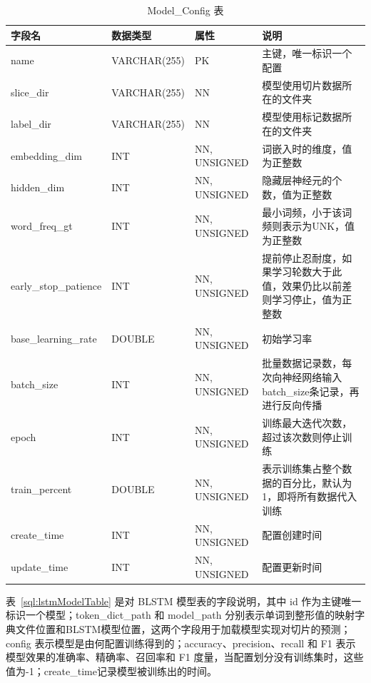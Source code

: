 \begin{table}[H]\footnotesize %
	\centering
	\caption{Model\_Config 表}
	\begin{tabular}{L{2.2cm}L{2cm}L{2.6cm}L{6cm}}
		\toprule
		\textbf{字段名}&\textbf{数据类型}&\textbf{属性}&\textbf{说明}\\
		\midrule
		name 						&VARCHAR(255)&PK&主键，唯一标识一个配置\\
		slice\_dir		 			&VARCHAR(255)&NN&模型使用切片数据所在的文件夹\\
		label\_dir		 			&VARCHAR(255)&NN&模型使用标记数据所在的文件夹\\
		embedding\_dim		  &INT&NN, UNSIGNED&词嵌入时的维度，值为正整数\\
		hidden\_dim				&INT&NN, UNSIGNED&隐藏层神经元的个数，值为正整数\\
		word\_freq\_gt			&INT&NN, UNSIGNED&最小词频，小于该词频则表示为UNK，值为正整数\\
		early\_stop\_patience		&INT&NN, UNSIGNED&提前停止忍耐度，如果学习轮数大于此值，效果仍比以前差则学习停止，值为正整数\\
		base\_learning\_rate		&DOUBLE&NN, UNSIGNED&初始学习率\\
		batch\_size					&INT&NN, UNSIGNED&批量数据记录数，每次向神经网络输入batch\_size条记录，再进行反向传播\\
		epoch						&INT&NN, UNSIGNED&训练最大迭代次数，超过该次数则停止训练\\
		train\_percent						&DOUBLE&NN, UNSIGNED&表示训练集占整个数据的百分比，默认为1，即将所有数据代入训练\\
		create\_time				&INT&NN, UNSIGNED&配置创建时间\\
		update\_time				&INT&NN, UNSIGNED&配置更新时间\\
		\bottomrule
	\end{tabular}
	\label{sql:modelConfigTable}
\end{table}

表~\ref{sql:lstmModelTable} 是对 BLSTM 模型表的字段说明，其中 id 作为主键唯一标识一个模型；token\_dict\_path 和 model\_path 分别表示单词到整形值的映射字典文件位置和BLSTM模型位置，这两个字段用于加载模型实现对切片的预测；config 表示模型是由何配置训练得到的；accuracy、precision、recall 和 F1 表示模型效果的准确率、精确率、召回率和 F1 度量，当配置划分没有训练集时，这些值为-1；create\_time记录模型被训练出的时间。

